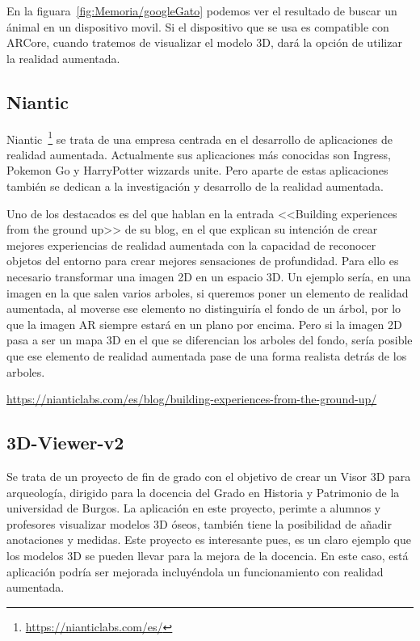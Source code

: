 En la figuara~\ref{fig:Memoria/googleGato} podemos ver el resultado de buscar un ánimal en un dispositivo movil. Si el dispositivo que se usa es compatible con ARCore, cuando tratemos de visualizar el modelo 3D, dará la opción de utilizar la realidad aumentada.


\subsection{Niantic}
Niantic~\footnote{\url{https://nianticlabs.com/es/}} se trata de una empresa centrada en el desarrollo de aplicaciones de realidad aumentada. Actualmente sus aplicaciones más conocidas son Ingress, Pokemon Go y HarryPotter wizzards unite.
Pero aparte de estas aplicaciones también se dedican a la investigación y desarrollo de la realidad aumentada.

Uno de los destacados es del que hablan en la entrada <<Building experiences from the ground up>> de su blog, en el que explican su intención de crear mejores experiencias de realidad aumentada con
la capacidad de reconocer objetos del entorno para crear mejores sensaciones de profundidad. Para ello es necesario transformar una imagen 2D en un espacio 3D. Un ejemplo sería, en una imagen en la que salen varios arboles, si queremos poner un elemento de realidad aumentada, al moverse ese elemento no distinguiría el fondo de un árbol, por lo que la imagen AR siempre estará en un plano por encima. Pero si la imagen 2D pasa a ser un mapa 3D en el que se diferencian los arboles del fondo, sería posible que ese elemento de realidad aumentada pase de una forma realista detrás de los arboles. 

\url{https://nianticlabs.com/es/blog/building-experiences-from-the-ground-up/}



\subsection{3D-Viewer-v2}

Se trata de un proyecto de fin de grado con el objetivo de crear un Visor 3D para arqueología, dirigido para la docencia del Grado en Historia y Patrimonio de la universidad de Burgos.
La aplicación en este proyecto, perimte a alumnos y profesores visualizar modelos 3D óseos, también tiene la posibilidad de añadir anotaciones y medidas. Este proyecto es interesante pues, es un claro ejemplo que los modelos 3D se pueden llevar para la mejora de la docencia. En este caso, está aplicación podría ser mejorada incluyéndola un funcionamiento con realidad aumentada.

